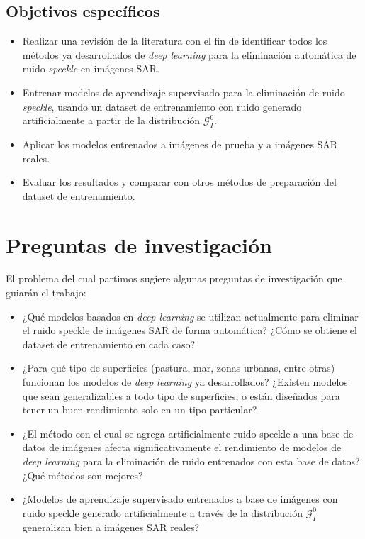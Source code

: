 \subsection{Objetivos específicos}

\begin{itemize}
	\item Realizar una revisión de la literatura con el fin de identificar todos los métodos ya 	desarrollados de \emph{deep learning} para la eliminación automática de ruido \emph{speckle} en imágenes SAR.
	\item Entrenar modelos de aprendizaje supervisado para la eliminación de ruido \emph{speckle}, usando un dataset de entrenamiento con ruido generado artificialmente a partir de la distribución \( \mathcal{G}_I^0 \).
	\item Aplicar los modelos entrenados a imágenes de prueba y a imágenes SAR reales.
	\item Evaluar los resultados y comparar con otros métodos de preparación del dataset de
	entrenamiento.
\end{itemize}

\section{Preguntas de investigación}

El problema del cual partimos sugiere algunas preguntas de investigación que guiarán el trabajo:

\begin{itemize}
	\item ¿Qué modelos basados en \emph{deep learning} se utilizan actualmente para eliminar el	ruido speckle de imágenes SAR de forma automática? ¿Cómo se obtiene el dataset
	de entrenamiento en cada caso?
	\item ¿Para qué tipo de superficies (pastura, mar, zonas urbanas, entre otras) funcionan los modelos de \emph{deep learning} ya desarrollados? ¿Existen modelos que sean generalizables a todo tipo de superficies, o están diseñados para tener un buen rendimiento solo en un tipo particular?
	\item ¿El método con el cual se agrega artificialmente ruido speckle a una base de datos de imágenes afecta significativamente el rendimiento de modelos de \emph{deep learning} para la eliminación de ruido entrenados con esta base de datos? ¿Qué métodos son	mejores?
	\item ¿Modelos de aprendizaje supervisado entrenados a base de imágenes con ruido
	speckle generado artificialmente a través de la distribución  $\mathcal{G}_I^0$ generalizan bien a imágenes SAR reales?
\end{itemize}

